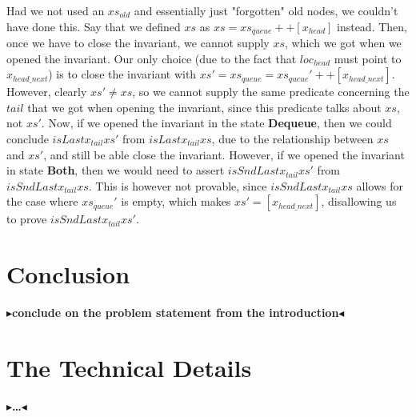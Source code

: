 \documentclass[twoside,11pt,openright]{report}
\newcommand{\DequeueState}{\textbf{Dequeue}}
\newcommand{\BothState}{\textbf{Both}}
\newcommand{\todo}[1]{{\color[rgb]{.5,0,0}\textbf{$\blacktriangleright$#1$\blacktriangleleft$}}}
\begin{document}
Had we not used an $xs_{old}$ and essentially just "forgotten" old nodes, we couldn't have done this. Say that we defined $xs$ as $xs = xs_{queue} ++ [x_{head}]$ instead. Then, once we have to close the invariant, we cannot supply $xs$, which we got when we opened the invariant. Our only choice (due to the fact that $loc_{head}$ must point to $x_{head\_next}$) is to close the invariant with $xs' = xs_{queue} = xs_{queue}' ++ [x_{head\_next}]$. However, clearly $xs' \neq xs$, so we cannot supply the same predicate concerning the $tail$ that we got when opening the invariant, since this predicate talks about $xs$, not $xs'$. Now, if we opened the invariant in the state \DequeueState{}, then we could conclude $isLast x_{tail} xs'$ from $isLast x_{tail} xs$, due to the relationship between $xs$ and $xs'$, and still be able close the invariant. However, if we opened the invariant in state \BothState{}, then we would need to assert $isSndLast x_{tail} xs'$ from $isSndLast x_{tail} xs$. This is however not provable, since $isSndLast x_{tail} xs$ allows for the case where $xs_{queue}'$ is empty, which makes $xs' = [x_{head\_next}]$, disallowing us to prove $isSndLast x_{tail} xs'$.



\chapter{Conclusion}
\label{ch:conclusion}

\todo{conclude on the problem statement from the introduction}


\cleardoublepage
{}
 



\cleardoublepage
\appendix
\chapter{The Technical Details}

\todo{\dots}
\end{document}
